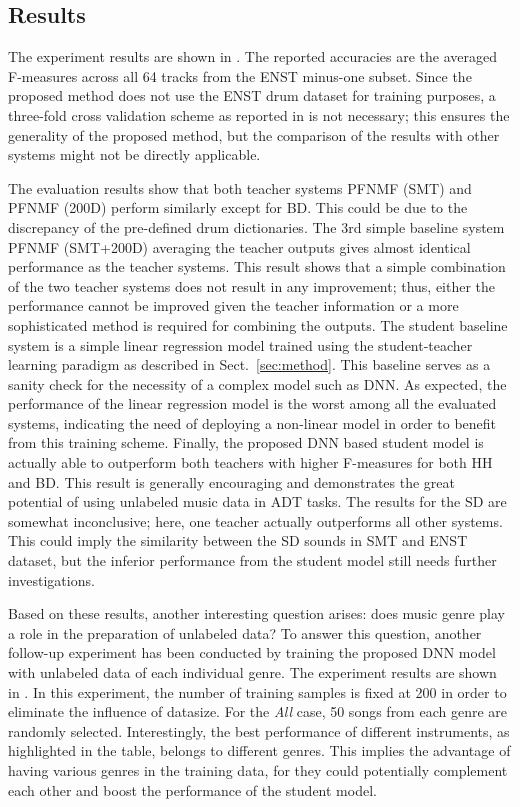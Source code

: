 \documentclass{article}
\begin{document}
\subsection{Results}
The experiment results are shown in . The reported accuracies are the averaged F-measures across all 64 tracks from the ENST minus-one subset. Since the proposed method does not use the ENST drum dataset for training purposes, a three-fold cross validation scheme as reported in \cite{Paulus2009a, Wu2015a, Vogl2016, Vogl2017, Southall2016} is not necessary; this ensures the generality of the proposed method, but the comparison of the results with other systems might not be directly applicable.  

%

%
The evaluation results show that both teacher systems PFNMF (SMT) and PFNMF (200D) perform similarly except for BD. This could be due to the discrepancy of the pre-defined drum dictionaries. 
The 3rd simple baseline system PFNMF (SMT+200D) averaging the teacher outputs gives almost identical performance as the teacher systems. This result shows that a simple combination of the two teacher systems does not result in any improvement; thus, either the performance cannot be improved given the teacher information or a more sophisticated method is required for combining the outputs. 
The student baseline system is a simple linear regression model trained using the student-teacher learning paradigm as described in Sect.~\ref{sec:method}. This baseline serves as a sanity check for the necessity of a complex model such as DNN. As expected, the performance of the linear regression model is the worst among all the evaluated systems, indicating the need of deploying a non-linear model in order to benefit from this training scheme. 
Finally, the proposed DNN based student model is actually able to outperform both teachers with higher F-measures for both HH and BD. This result is generally encouraging and demonstrates the great potential of using unlabeled music data in ADT tasks. The results for the SD are somewhat inconclusive; here, one teacher actually outperforms all other systems. This could imply the similarity between the SD sounds in SMT and ENST dataset, but the inferior performance from the student model still needs further investigations. 

Based on these results, another interesting question arises: does music genre play a role in the preparation of unlabeled data? To answer this question, another follow-up experiment has been conducted by training the proposed DNN model with unlabeled data of each individual genre. The experiment results are shown in . In this experiment, the number of training samples is fixed at 200 in order to eliminate the influence of datasize. For the \textit{All} case, 50 songs from each genre are randomly selected. Interestingly, the best performance of different instruments, as highlighted in the table, belongs to different genres. This implies the advantage of having various genres in the training data, for they could potentially complement each other and boost the performance of the student model. 
\end{document}

